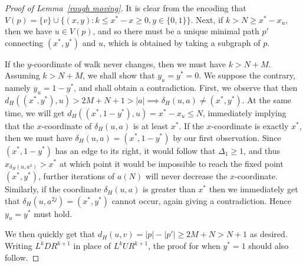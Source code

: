 \documentclass[a4paper]{article}
\theoremstyle{definition}
\newcommand{\hide}[1]{}
\begin{document}
\begin{proof}[Proof of Lemma~\ref*{rough moving}]
    It is clear from the encoding that $V(p) = \{v\} \cup \{(x,y):k\le x^*-x\ge 0, y\in \{0,1\}\}$. Next, if $k > N\ge x^*-x_u$, then we have $u\in V(p)$, and so there must be a unique minimal path $p'$ connecting $(x^*,y^*)$ and $u$, which is obtained by taking a subgraph of $p$.
    
    If the $y$-coordinate of walk never changes, then we must have $k> N+M$. Assuming $k> N+M$, we shall show that $y_u = y^* = 0$. We suppose the contrary, namely $y_u = 1-y^*$, and shall obtain a contradiction. First, we observe that then $d_H((x^*,y^*),u) > 2M+N+1>|a| \implies \delta_H(u,a) \neq (x^*,y^*)$. At the same time, we will get $d_H((x^*,1-y^*),u) = x^*-x_u \le N$, immediately implying that the $x$-coordinate of $\delta_H(u,a)$ is at least $x^*$. If the $x$-coordinate is exactly $x^*$, then we must have $\delta_H(u,a) = (x^*,1-y^*)$ by our first observation. Since $(x^*,1-y^*)$ has an edge to its right, it would follow that $\Delta_1 \ge 1$, and thus $x_{\delta_H(u,a^2)}> x^*$ at which point it would be impossible to reach the fixed point $(x^*,y^*)$, further iterations of $a(N)$ will never decrease the $x$-coordinate. Similarly, if the coordinate $\delta_H(u,a)$ is greater than $x^*$ then we immediately get that $\delta_H(u,a^{2j})= (x^*,y^*)$ cannot occur, again giving a contradiction. Hence $y_u = y^*$ must hold. 
    
    We then quickly get that $d_H(u,v) = |p|-|p'| \ge 2M+N > N+1$ as desired. Writing $L^kDR^{k+1}$ in place of $L^kUR^{k+1}$, the proof for when $y^* =1$ should also follow.
    
    \hide{
    We now consider 3 subcases.
    
    Subcase 2.1: $x^*-x_u <N+1$, $y^* = 0$
    
    Since $(x^*,y^*)$ does not have an edge to its right, there must exist a unique, minimal path $p$ from itself to $v$; furthermore, the walk associated with $p$ must be encoded by a sequence of actions of the form $L^kUR^{k+1}$ for some $k\ge 0$.\footnote{As $H$ is connected, a minimal walk between the vertices must exist. We then claim that any minimal walk must be of the form $L^kUR^{k+1}$ for some non-negative $k$. Initially we have $y$-coordinate 0 and cannot take an edge downwards or rightwards. If we go left our $y$-coordinate is still 0, since we do not backtrack in a minimal walk we shall not head right, and we still cannot go down, and thus we are in the same situation as before. Eventually we will go up, and reach $y$-coordinate 1, after which point it will only make sense to go right.} (a walk $v_0,\dots ,v_n$ is encoded by a sequence of actions $s_1,\dots s_n \in S^*$ if $v_{i} = \delta_H(v_{i-1},s_i)$ for $1\le i\le n$) 
    
}
\end{proof}
\end{document}
